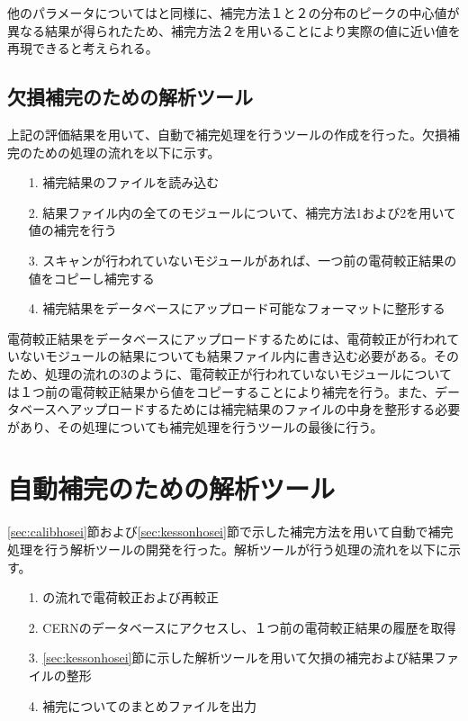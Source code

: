 他のパラメータについてはと同様に、補完方法１と２の分布のピークの中心値が異なる結果が得られたため、補完方法２を用いることにより実際の値に近い値を再現できると考えられる。

\subsection{欠損補完のための解析ツール}
上記の評価結果を用いて、自動で補完処理を行うツールの作成を行った。欠損補完のための処理の流れを以下に示す。
\begin{itemize}
  \item[1. ] 補完結果のファイルを読み込む
  \item[2. ] 結果ファイル内の全てのモジュールについて、補完方法1および2を用いて値の補完を行う
  \item[3. ] スキャンが行われていないモジュールがあれば、一つ前の電荷較正結果の値をコピーし補完する
  \item[4. ] 補完結果をデータベースにアップロード可能なフォーマットに整形する
\end{itemize}

電荷較正結果をデータベースにアップロードするためには、電荷較正が行われていないモジュールの結果についても結果ファイル内に書き込む必要がある。そのため、処理の流れの3のように、電荷較正が行われていないモジュールについては１つ前の電荷較正結果から値をコピーすることにより補完を行う。また、データベースへアップロードするためには補完結果のファイルの中身を整形する必要があり、その処理についても補完処理を行うツールの最後に行う。

\section{自動補完のための解析ツール}
\label{sec:kaisekitool}
\ref{sec:calibhosei}節および\ref{sec:kessonhosei}節で示した補完方法を用いて自動で補完処理を行う解析ツールの開発を行った。解析ツールが行う処理の流れを以下に示す。

\begin{itemize}
  \item[1. ] の流れで電荷較正および再較正
  \item[2. ] CERNのデータベースにアクセスし、１つ前の電荷較正結果の履歴を取得
  \item[3. ] \ref{sec:kessonhosei}節に示した解析ツールを用いて欠損の補完および結果ファイルの整形
  \item[4. ] 補完についてのまとめファイルを出力
\end{itemize}

